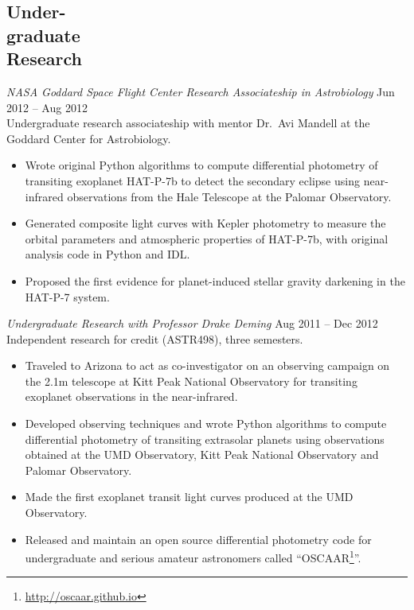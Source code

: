 \documentclass[margin]{res}
\begin{document}
\begin{resume}
\section{Under-\\graduate\\Research} 
{\sl NASA Goddard Space Flight Center Research Associateship in Astrobiology} \hfill            Jun 2012 -- Aug 2012 \\
Undergraduate research associateship with mentor Dr.\ Avi Mandell at the Goddard Center for Astrobiology.
\begin{itemize}%
\item Wrote original Python algorithms to compute differential photometry of transiting exoplanet HAT-P-7b to detect the secondary eclipse using near-infrared observations from the Hale Telescope at the Palomar Observatory. 

\item Generated composite light curves with Kepler photometry to measure the orbital parameters and atmospheric properties of HAT-P-7b, with original analysis code in Python and IDL. 

\item Proposed the first evidence for planet-induced stellar gravity darkening in the HAT-P-7 system.
\end{itemize}  


{\sl Undergraduate Research with Professor Drake Deming} \hfill            Aug 2011 -- Dec 2012 \\
Independent research for credit (ASTR498), three semesters. 
\begin{itemize}
\item Traveled to Arizona to act as co-investigator on an observing campaign on the 2.1m telescope at Kitt Peak National Observatory for transiting exoplanet observations in the near-infrared. 

\item Developed observing techniques and wrote Python algorithms to compute differential photometry of transiting extrasolar planets using observations obtained at the UMD Observatory, Kitt Peak National Observatory and Palomar Observatory. 

\item Made the first exoplanet transit light curves produced at the UMD Observatory.

\item Released and maintain an open source differential photometry code for undergraduate and serious amateur astronomers called ``OSCAAR\footnote{\url{http://oscaar.github.io}}''.


\end{itemize}
\end{resume}
\end{document}
